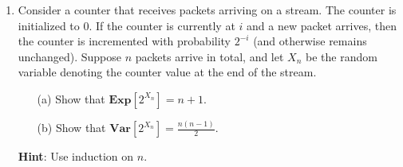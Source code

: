 \documentclass[11pt]{article}
\begin{document}
\begin{enumerate}
\item
Consider a counter that receives packets arriving on a stream. The counter is initialized to $0$. If the counter is currently at $i$ and a new packet arrives, then the counter is incremented with probability $2^{-i}$ (and otherwise remains unchanged). Suppose $n$ packets arrive in total, and let $X_n$ be the random variable denoting the counter value at the end of the stream.
\begin{enumerate}
\item[(a)]
Show that $\mathbf{Exp}[2^{X_n}] = n+1$. 
\item[(b)]
Show that $\mathbf{Var}[2^{X_n}] = \frac{n(n-1)}{2}$.
\end{enumerate}

\noindent \textbf{Hint}: Use induction on $n$.
\end{enumerate}
\end{document}
